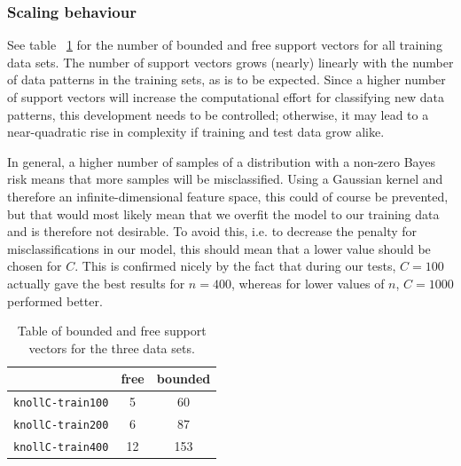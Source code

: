 \documentclass{article}
\begin{document}
\subsubsection{Scaling behaviour}

See table ~\ref{tab:knoll_free_bounded_SV} for the number of bounded and free support vectors for all training data sets. The number of support vectors grows (nearly) linearly with the number of data patterns in the training sets, as is to be expected. Since a higher number of support vectors will increase the computational effort for classifying new data patterns, this development needs to be controlled; otherwise, it may lead to a near-quadratic rise in complexity if training and test data grow alike. 

In general, a higher number of samples of a distribution with a non-zero Bayes risk means that more samples will be misclassified. Using a Gaussian kernel and therefore an infinite-dimensional feature space, this could of course be prevented, but that would most likely mean that we overfit the model to our training data and is therefore not desirable. To avoid this, i.e. to decrease the penalty for misclassifications in our model, this should mean that a lower value should be chosen for $C$. This is confirmed nicely by the fact that during our tests, $C=100$ actually gave the best results for $n=400$, whereas for lower values of $n$, $C=1000$ performed better. 

\begin{table}[h!]
  \centering
  \begin{tabular}{l | c | c}
    \hfill & free & bounded\\\hline
    \texttt{knollC-train100} & 5 & 60 \\
    \texttt{knollC-train200} & 6 & 87 \\
    \texttt{knollC-train400} & 12 & 153 \\
  \end{tabular}
  \caption{Table of bounded and free support vectors for the three data sets.}
  \label{tab:knoll_free_bounded_SV}
\end{table}
\end{document}
